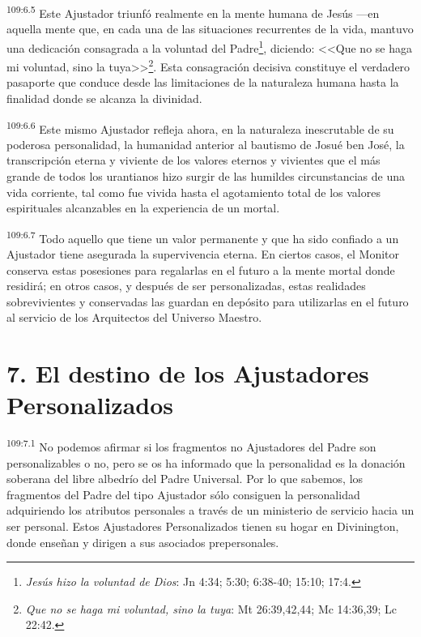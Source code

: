 \par
\textsuperscript{109:6.5} Este Ajustador triunfó realmente en la mente humana de Jesús ---en aquella mente que, en cada una de las situaciones recurrentes de la vida, mantuvo una dedicación consagrada a la voluntad del Padre\footnote{\textit{Jesús hizo la voluntad de Dios}: Jn 4:34; 5:30; 6:38-40; 15:10; 17:4.}, diciendo: <<Que no se haga mi voluntad, sino la tuya>>\footnote{\textit{Que no se haga mi voluntad, sino la tuya}: Mt 26:39,42,44; Mc 14:36,39; Lc 22:42.}. Esta consagración decisiva constituye el verdadero pasaporte que conduce desde las limitaciones de la naturaleza humana hasta la finalidad donde se alcanza la divinidad.

\par
\textsuperscript{109:6.6} Este mismo Ajustador refleja ahora, en la naturaleza inescrutable de su poderosa personalidad, la humanidad anterior al bautismo de Josué ben José, la transcripción eterna y viviente de los valores eternos y vivientes que el más grande de todos los urantianos hizo surgir de las humildes circunstancias de una vida corriente, tal como fue vivida hasta el agotamiento total de los valores espirituales alcanzables en la experiencia de un mortal.

\par
\textsuperscript{109:6.7} Todo aquello que tiene un valor permanente y que ha sido confiado a un Ajustador tiene asegurada la supervivencia eterna. En ciertos casos, el Monitor conserva estas posesiones para regalarlas en el futuro a la mente mortal donde residirá; en otros casos, y después de ser personalizadas, estas realidades sobrevivientes y conservadas las guardan en depósito para utilizarlas en el futuro al servicio de los Arquitectos del Universo Maestro.

\section*{7. El destino de los Ajustadores Personalizados}
\par
\textsuperscript{109:7.1} No podemos afirmar si los fragmentos no Ajustadores del Padre son personalizables o no, pero se os ha informado que la personalidad es la donación soberana del libre albedrío del Padre Universal. Por lo que sabemos, los fragmentos del Padre del tipo Ajustador sólo consiguen la personalidad adquiriendo los atributos personales a través de un ministerio de servicio hacia un ser personal. Estos Ajustadores Personalizados tienen su hogar en Divinington, donde enseñan y dirigen a sus asociados prepersonales.

